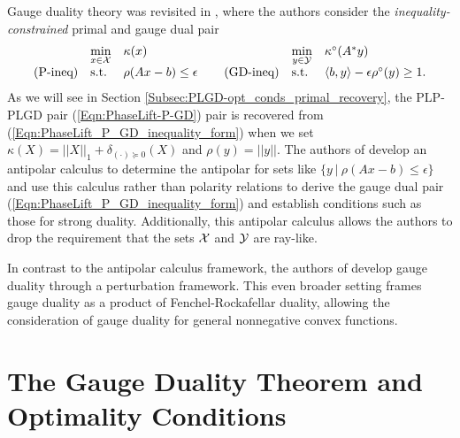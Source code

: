 Gauge duality theory was revisited in \cite{DBLP:journals/siamjo/FriedlanderMP14}, where the authors consider the \textit{inequality-constrained} primal and gauge dual pair
\begin{equation} 			\label{Eqn:PhaseLift_P_GD_inequality_form}
\begin{array}{lllllll}
	&	\min\limits_{\substack{x \in {\mathcal X}}}
		&	\kappa(x)
			&
				&	\min\limits_{\substack{y \in {\mathcal Y}}}
					&	\kappa^\circ(A^*y)
						\\
\textnormal{(P-ineq)}
	&	\textnormal{s.t.}
		& 	\rho(Ax-b) \leq \epsilon
			&	\hspace{0.4cm} 	\textnormal{(GD-ineq)}
				&	\textnormal{s.t.}
					&	\langle b, y \rangle - \epsilon \rho^\circ(y) \geq 1.
\end{array}
\end{equation}
As we will see in Section \ref{Subsec:PLGD-opt_conds_primal_recovery}, the PLP-PLGD pair (\ref{Eqn:PhaseLift-P-GD}) pair is recovered from (\ref{Eqn:PhaseLift_P_GD_inequality_form}) when we set $\kappa(X) = ||X||_1 + \delta_{(\cdot) \succeq 0}(X)$ and $\rho(y) = ||y||$.  The authors of \cite{DBLP:journals/siamjo/FriedlanderMP14} develop an antipolar calculus to determine the antipolar for sets like $\{ y \ | \ \rho(Ax-b) \leq \epsilon \}$ and use this calculus rather than polarity relations to derive the gauge dual pair (\ref{Eqn:PhaseLift_P_GD_inequality_form}) and establish conditions such as those for strong duality.  Additionally, this antipolar calculus allows the authors to drop the requirement that the sets ${\mathcal X}$ and ${\mathcal Y}$ are ray-like.

In contrast to the antipolar calculus framework, the authors of \cite{aravkin2017foundations} develop gauge duality through a perturbation framework.  This even broader setting frames gauge duality as a product of Fenchel-Rockafellar duality, allowing the consideration of gauge duality for 
general nonnegative convex functions.









\section{The Gauge Duality Theorem and Optimality Conditions} 			\label{Subsec:PLGD-theory}




